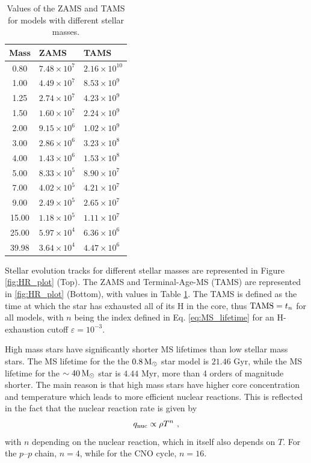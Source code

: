 \begin{table}[!ht]
    \centering
    \caption{\small Values of the ZAMS and TAMS for models with different stellar masses.}
    \begin{tabular}{|c|l|l|}
        \hline
        Mass  & ZAMS                 & TAMS                  \\ \hline
        0.80  & $7.48 \times 10^{7}$ & $2.16 \times 10^{10}$ \\ \hline
        1.00  & $4.49 \times 10^{7}$ & $8.53 \times 10^{9}$  \\  \hline
        1.25  & $2.74 \times 10^{7}$ & $4.23 \times 10^{9}$  \\ \hline
        1.50  & $1.60 \times 10^{7}$ & $2.24 \times 10^{9}$  \\ \hline
        2.00  & $9.15 \times 10^{6}$ & $1.02 \times 10^{9}$  \\ \hline
        3.00  & $2.86 \times 10^{6}$ & $3.23 \times 10^{8}$  \\ \hline
        4.00  & $1.43 \times 10^{6}$ & $1.53 \times 10^{8}$  \\ \hline
        5.00  & $8.33 \times 10^{5}$ & $8.90 \times 10^{7}$  \\ \hline
        7.00  & $4.02 \times 10^{5}$ & $4.21 \times 10^{7}$  \\ \hline
        9.00  & $2.49 \times 10^{5}$ & $2.65 \times 10^{7}$  \\ \hline
        15.00 & $1.18 \times 10^{5}$ & $1.11 \times 10^{7}$  \\ \hline
        25.00 & $5.97 \times 10^{4}$ & $6.36 \times 10^{6}$  \\ \hline
        39.98 & $3.64 \times 10^{4}$ & $4.47 \times 10^{6}$  \\ \hline
    \end{tabular}
    \label{tab:ages}
\end{table}

\newpage

Stellar evolution tracks for different stellar masses are represented in Figure \ref{fig:HR_plot} (Top). The ZAMS and Terminal-Age-MS (TAMS) are represented in \ref{fig:HR_plot} (Bottom), with values in Table \ref{tab:ages}. The TAMS is defined as the time at which the star has exhausted all of its H in the core, thus ${\rm TAMS} = t_n$ for all models, with $n$ being the index defined in Eq. \eqref{eq:MS_lifetime} for an H-exhaustion cutoff $\varepsilon=10^{-3}$.

High mass stars have significantly shorter MS lifetimes than low stellar mass stars. The MS lifetime for the the  $0.8 \, {\rm M}_\odot$ star model is $21.46$ Gyr, while the MS lifetime for the $\sim 40 \, {\rm M}_\odot$ star is $4.44$ Myr, more than 4 orders of magnitude shorter. The main reason is that high mass stars have higher core concentration and temperature which leads to more efficient nuclear reactions. This is reflected in the fact that the nuclear reaction rate is given by
\begin{equation}
    q_{\rm nuc} \propto \rho T^n \ ,
\end{equation}
with $n$ depending on the nuclear reaction, which in itself also depends on $T$. For the $p\text{--}p$ chain, $n=4$, while for the CNO cycle, $n=16$.

